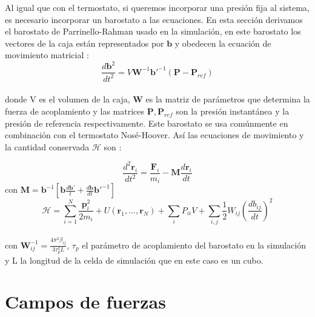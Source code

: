 Al igual que con el termostato, si queremos incorporar una presión fija al sistema, es necesario incorporar un barostato a las ecuaciones. En esta sección derivamos el barostato de Parrinello-Rahman usado en la simulación, en este barostato los vectores de la caja están representados por $\mathbf{b}$ y obedecen la ecuación de movimiento matricial\cite{gromacsdoc} \cite{simone1993}:\\

\begin{equation} \label{parrrahman}
    \frac{d\mathbf{b}^2}{dt^2}=V\mathbf{W}^{-1}\mathbf{b'}^{-1}(\mathbf{P}-\mathbf{P}_{ref})
\end{equation}\\

\noindent donde V es el volumen de la caja, $\mathbf{W}$ es la matriz de parámetros que determina la fuerza de acoplamiento y las matrices $\mathbf{P},\mathbf{P}_{ref}$ son la presión instantánea y la presión de referencia respectivamente. Este barostato se usa comúnmente en combinación con el termostato Nosé-Hoover. Así las ecuaciones de movimiento y la cantidad conservada $\mathcal{H}$ son \cite{gromacsdoc}:

\begin{equation} \label{NHPRmotionr}
    \frac{d^2\mathbf{r}_i}{dt^2} = \frac{\mathbf{F}_i}{m_i}-\mathbf{M}\frac{d\mathbf{r}_i}{dt}
\end{equation}
con $\mathbf{M}=\mathbf{b}^{-1}\left[\mathbf{b}\frac{d\mathbf{b'}}{t}+\frac{d\mathbf{b}}{dt}\mathbf{b'}^{-1} \right]$
\begin{equation} \label{conservedNoseHooverParrRahm}
    \mathcal{H} = \sum_{i=1}^{N}\frac{\mathbf{p}_i^2}{2m_i} + U(\mathbf{r}_1,...,\mathbf{r}_N) + \sum_i P_{ii}V + \sum_{i,j}\frac{1}{2}W_{ij}\left(\frac{db_{ij}}{dt}\right)^2
\end{equation}\\

\noindent con $\mathbf{W}^{-1}_{ij}=\frac{4\pi^2 \beta_{ij}}{3\tau_{p}^2 L}$, $\tau_p$ el parámetro de acoplamiento del barostato en la simulación y L la longitud de la celda de simulación que en este caso es un cubo.

\section{Campos de fuerzas}

